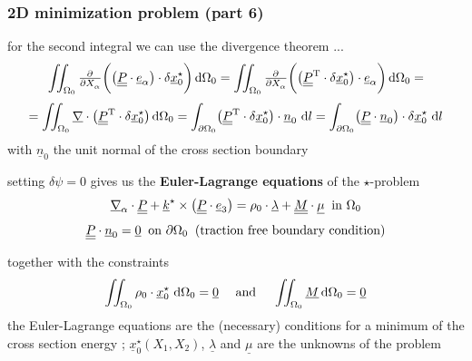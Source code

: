 \begin{frame}
  \frametitle{2D minimization problem (part 6)}

  for the second integral we can use the divergence theorem ...
  \begin{displaymath}
    \iint_{\Omega_0}
      \pd{}{X_{\alpha}} \biggl( \bigl( \doubleunderline{P} \cdot \underline{e}_{\alpha} \bigr) \cdot \delta \underline{x}_0^{\star} \biggr)
    \dif \Omega_0 =
    \iint_{\Omega_0}
      \pd{}{X_{\alpha}} \biggl( \bigl( \doubleunderline{P}^{\mathrm{T}} \cdot \delta \underline{x}_0^{\star} \bigr) \cdot \underline{e}_{\alpha} \biggr)
    \dif \Omega_0 =
  \end{displaymath}
  \begin{displaymath}
    = \iint_{\Omega_0}
      \underline{\nabla} \cdot \bigl( \doubleunderline{P}^{\mathrm{T}} \cdot \delta \underline{x}_0^{\star} \bigr)
    \dif \Omega_0 =
    \int_{\partial \Omega_0}
      \bigl( \doubleunderline{P}^{\mathrm{T}} \cdot \delta \underline{x}_0^{\star} \bigr) \cdot \underline{n}_0 \,
    \dif l =
    \int_{\partial \Omega_0}
      \bigl( \doubleunderline{P} \cdot \underline{n}_0 \bigr) \cdot \delta \underline{x}_0^{\star} \,
    \dif l
  \end{displaymath}
  with $\underline{n}_0$ the unit normal of the cross section boundary
  
  \vspace{1em}
  setting $\delta \psi = 0$ gives us the \textbf{Euler-Lagrange equations} of the $\star$-problem
  \begin{displaymath}
    \underline{\nabla}_{\alpha} \cdot \underline{\underline{P}} +
    \underline{k}^{\star} \times \bigl( \underline{\underline{P}} \cdot \underline{e}_3 \bigr) =
    \rho_0 \cdot \underline{\lambda} +
    \underline{\underline{M}} \cdot \underline{\mu}
    \: \text{ in } \Omega_0    
  \end{displaymath}
  \begin{displaymath}
    \underline{\underline{P}} \cdot \underline{n}_0 = \underline{0}
    \: \text{ on } \partial \Omega_0
    \: \text{ (traction free boundary condition)}
  \end{displaymath}
  
  \vspace{1em}

  together with the constraints
  \begin{displaymath}
    \iint_{\Omega_0} \rho_0 \cdot \underline{x}_0^{\star} \, \dif \Omega_0 = \underline{0}
    \quad \text{ and } \quad
    \iint_{\Omega_0} \underline{M} \dif \Omega_0 = \underline{0}
  \end{displaymath}
  the Euler-Lagrange equations are the (necessary) conditions for a minimum of the cross section energy ; $\underline{x}_0^{\star}(X_1,X_2)$, $\underline{\lambda}$ and $\underline{\mu}$ are the unknowns of the problem
\end{frame}



